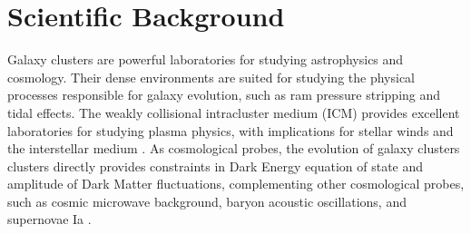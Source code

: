 \documentclass[letterpaper,11pt]{article}
\begin{document}
\section{Scientific Background}

Galaxy clusters are powerful laboratories for studying astrophysics and cosmology. Their dense environments are suited for studying the physical processes responsible for galaxy evolution, such as ram pressure stripping and tidal effects. The weakly collisional intracluster medium (ICM) provides excellent laboratories for studying plasma physics, with implications for stellar winds and the interstellar medium \citep{Schekochihin2009}. As cosmological probes, the evolution of galaxy clusters clusters directly provides constraints in Dark Energy equation of state and amplitude of Dark Matter fluctuations, complementing other cosmological probes, such as cosmic microwave background, baryon acoustic oscillations, and supernovae Ia \citep{Planck2016}. 
\end{document}
